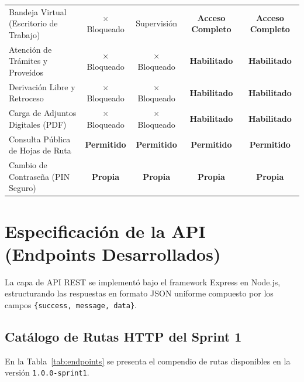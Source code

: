 \documentclass[a4paper,12pt]{article}
\begin{document}
\begin{table}[H]
\begin{tabularx}{\linewidth}{@{}>{\raggedright\arraybackslash}p{4.7cm}*{4}{C}@{}}
Bandeja Virtual (Escritorio de Trabajo) & \color{colorAlerta}$\times$ Bloqueado & \color{colorInfo}Supervisión & \textbf{\color{colorExito}Acceso Completo} & \textbf{\color{colorExito}Acceso Completo} \\
Atención de Trámites y Proveídos & \color{colorAlerta}$\times$ Bloqueado & \color{colorAlerta}$\times$ Bloqueado & \textbf{\color{colorExito}Habilitado} & \textbf{\color{colorExito}Habilitado} \\
Derivación Libre y Retroceso & \color{colorAlerta}$\times$ Bloqueado & \color{colorAlerta}$\times$ Bloqueado & \textbf{\color{colorExito}Habilitado} & \textbf{\color{colorExito}Habilitado} \\
Carga de Adjuntos Digitales (PDF) & \color{colorAlerta}$\times$ Bloqueado & \color{colorAlerta}$\times$ Bloqueado & \textbf{\color{colorExito}Habilitado} & \textbf{\color{colorExito}Habilitado} \\
Consulta Pública de Hojas de Ruta & \textbf{\color{colorExito}Permitido} & \textbf{\color{colorExito}Permitido} & \textbf{\color{colorExito}Permitido} & \textbf{\color{colorExito}Permitido} \\
Cambio de Contraseña (PIN Seguro) & \textbf{\color{colorExito}Propia} & \textbf{\color{colorExito}Propia} & \textbf{\color{colorExito}Propia} & \textbf{\color{colorExito}Propia} \\
\bottomrule
\end{tabularx}
\end{table}

\section{Especificación de la API (Endpoints Desarrollados)}

La capa de API REST se implementó bajo el framework Express en Node.js, estructurando las respuestas en formato JSON uniforme compuesto por los campos \texttt{\{success, message, data\}}.

\subsection{Catálogo de Rutas HTTP del Sprint 1}
En la Tabla~\ref{tab:endpoints} se presenta el compendio de rutas disponibles en la versión \texttt{1.0.0-sprint1}.
\end{document}
